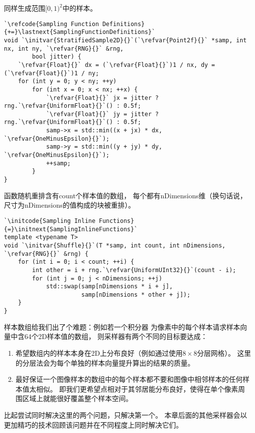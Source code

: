同样生成范围$[0,1)^2$中的样本。
\begin{lstlisting}
`\refcode{Sampling Function Definitions}{+=}\lastnext{SamplingFunctionDefinitions}`
void `\initvar{StratifiedSample2D}{}`(`\refvar{Point2f}{}` *samp, int nx, int ny, `\refvar{RNG}{}` &rng,
        bool jitter) {
    `\refvar{Float}{}` dx = (`\refvar{Float}{}`)1 / nx, dy = (`\refvar{Float}{}`)1 / ny;
    for (int y = 0; y < ny; ++y)
        for (int x = 0; x < nx; ++x) {
            `\refvar{Float}{}` jx = jitter ? rng.`\refvar{UniformFloat}{}`() : 0.5f;
            `\refvar{Float}{}` jy = jitter ? rng.`\refvar{UniformFloat}{}`() : 0.5f;
            samp->x = std::min((x + jx) * dx, `\refvar{OneMinusEpsilon}{}`);
            samp->y = std::min((y + jy) * dy, `\refvar{OneMinusEpsilon}{}`);
            ++samp;
        }
}
\end{lstlisting}

函数随机重排含有{\ttfamily count}个样本值的数组，
每个都有{\ttfamily nDimensions}维（换句话说，
尺寸为{\ttfamily nDimensions}的值构成的块被重排）。
\begin{lstlisting}
`\initcode{Sampling Inline Functions}{=}\initnext{SamplingInlineFunctions}`
template <typename T>
void `\initvar{Shuffle}{}`(T *samp, int count, int nDimensions, `\refvar{RNG}{}` &rng) {
    for (int i = 0; i < count; ++i) {
        int other = i + rng.`\refvar{UniformUInt32}{}`(count - i);
        for (int j = 0; j < nDimensions; ++j)
            std::swap(samp[nDimensions * i + j],
                      samp[nDimensions * other + j]);
    }
}
\end{lstlisting}

样本数组给我们出了个难题：例如若一个积分器
为像素中的每个样本请求样本向量中含64个2D样本值的数组，
则采样器有两个不同的目标要达成：
\begin{enumerate}
    \item 希望数组内的样本本身在2D上分布良好（例如通过使用$8\times8$分层网格）。
          这里的分层法会为每个单独的样本向量提升算出的结果的质量。
    \item 最好保证一个图像样本的数组中的每个样本都不要和图像中相邻样本的任何样本值太相似。
          即我们更希望点相对于其邻居能分布良好，使得在单个像素周围区域上就能很好覆盖整个样本空间。
\end{enumerate}

比起尝试同时解决这里的两个问题，只解决第一个。
本章后面的其他采样器会以更加精巧的技术回顾该问题并在不同程度上同时解决它们。

